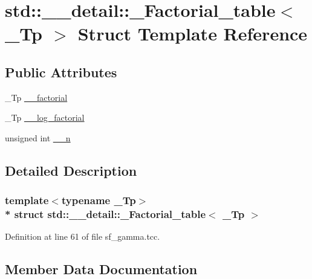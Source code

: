 \hypertarget{structstd_1_1____detail_1_1__Factorial__table}{}\section{std\+:\+:\+\_\+\+\_\+detail\+:\+:\+\_\+\+Factorial\+\_\+table$<$ \+\_\+\+Tp $>$ Struct Template Reference}
\label{structstd_1_1____detail_1_1__Factorial__table}
\subsection*{Public Attributes}
\begin{DoxyCompactItemize}
\item 
\+\_\+\+Tp \hyperlink{structstd_1_1____detail_1_1__Factorial__table_a4e8d20f3fa301037b097bb9f8e5f2060}{\+\_\+\+\_\+factorial}
\item 
\+\_\+\+Tp \hyperlink{structstd_1_1____detail_1_1__Factorial__table_a9d4b412d4d8b46ec660b0441516f412c}{\+\_\+\+\_\+log\+\_\+factorial}
\item 
unsigned int \hyperlink{structstd_1_1____detail_1_1__Factorial__table_ac05bdbe9d5090f0aa53adf8a3f8e3a45}{\+\_\+\+\_\+n}
\end{DoxyCompactItemize}


\subsection{Detailed Description}
\subsubsection*{template$<$typename \+\_\+\+Tp$>$\\*
struct std\+::\+\_\+\+\_\+detail\+::\+\_\+\+Factorial\+\_\+table$<$ \+\_\+\+Tp $>$}



Definition at line 61 of file sf\+\_\+gamma.\+tcc.



\subsection{Member Data Documentation}
